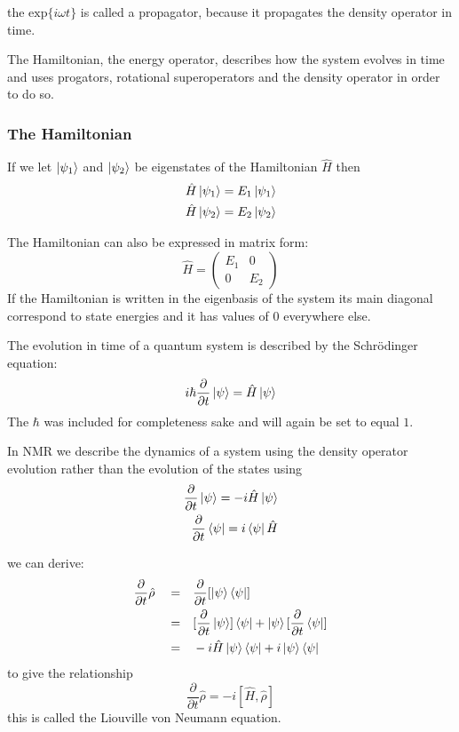 the $\text{exp}\{i\omega t\}$ is called a propagator, because it propagates the density operator in time.

The Hamiltonian, the energy operator, describes how the system evolves in time and uses progators, rotational superoperators and the density operator in order to do so.

\subsubsection{The Hamiltonian}\label{Hamiltonian}

If we let $\ket{\psi_1}$ and $\ket{\psi_2}$ be eigenstates of the Hamiltonian $\hat{H}$ then
\begin{align}
  \hat{H}\ket{\psi_1} = E_1\ket{\psi_1}\\
  \hat{H}\ket{\psi_2} = E_2\ket{\psi_2}
\end{align}

The Hamiltonian can also be expressed in matrix form:
\begin{equation}
  \hat{H} = \begin{pmatrix}
    E_1 & 0\\
    0 & E_2
\end{pmatrix}
\end{equation}
If the Hamiltonian is written in the eigenbasis of the system its main diagonal correspond to state energies and it has values of $0$ everywhere else.

The evolution in time of a quantum system is described by the Schr\"odinger equation:
\begin{equation}
  i\hbar\frac{\partial}{\partial{t}}\ket{\psi} = \hat{H}\ket{\psi}
\end{equation}
The $\hbar$ was included for completeness sake and will again be set to equal $1$.

In NMR we describe the dynamics of a system using the density operator evolution rather than the evolution of the states using
\begin{align}
  \frac{\partial}{\partial{t}}\ket{\psi} = -i\hat{H}\ket{\psi}\\
  \frac{\partial}{\partial{t}}\bra{\psi} = i\bra{\psi}\hat{H}
\end{align}

we can derive\citep{Neumann2018}:
\begin{align}
  \frac{\partial}{\partial{t}}\hat\rho\quad=&\quad \frac{\partial}{\partial{t}}[\ket{\psi}\bra{\psi}]\\
  =&\quad[\frac{\partial}{\partial{t}}\ket{\psi}]\bra{\psi} + \ket{\psi}[\frac{\partial}{\partial{t}}\bra{\psi}]\\
  =&\quad-i\hat{H}\ket{\psi}\bra{\psi} + i\ket{\psi}\bra{\psi}
\end{align}
to give the relationship
\begin{equation}
  \frac{\partial}{\partial{t}}\hat\rho = -i[\hat{H},\hat\rho]
\end{equation}
this is called the Liouville von Neumann equation.

